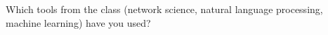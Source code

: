 Which tools from the class (network science, natural language processing, machine learning) have you used? 